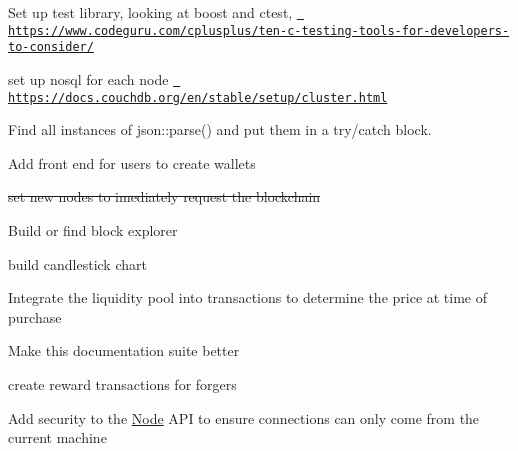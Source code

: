 
\begin{DoxyItemize}
\item Set up test library, looking at boost and ctest, \href{https://www.codeguru.com/cplusplus/ten-c-testing-tools-for-developers-to-consider/}{\texttt{ https\+://www.\+codeguru.\+com/cplusplus/ten-\/c-\/testing-\/tools-\/for-\/developers-\/to-\/consider/}}
\item set up nosql for each node \href{https://docs.couchdb.org/en/stable/setup/cluster.html}{\texttt{ https\+://docs.\+couchdb.\+org/en/stable/setup/cluster.\+html}}
\item Find all instances of json\+::parse() and put them in a try/catch block.
\item Add front end for users to create wallets
\item \sout{set new nodes to imediately request the blockchain}
\item Build or find block explorer
\item build candlestick chart
\item Integrate the liquidity pool into transactions to determine the price at time of purchase
\item Make this documentation suite better
\item create reward transactions for forgers
\item Add security to the \mbox{\hyperlink{class_node}{Node}} API to ensure connections can only come from the current machine 
\end{DoxyItemize}